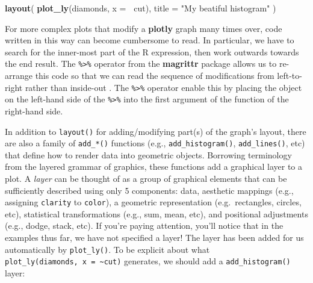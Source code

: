 \documentclass[
  12pt,
]{krantz}
\newenvironment{Shaded}{\begin{snugshade}}{\end{snugshade}}
\newcommand{\DataTypeTok}[1]{\textcolor[rgb]{0.13,0.29,0.53}{#1}}
\newcommand{\KeywordTok}[1]{\textcolor[rgb]{0.13,0.29,0.53}{\textbf{#1}}}
\newcommand{\NormalTok}[1]{#1}
\newcommand{\OperatorTok}[1]{\textcolor[rgb]{0.81,0.36,0.00}{\textbf{#1}}}
\newcommand{\StringTok}[1]{\textcolor[rgb]{0.31,0.60,0.02}{#1}}
\begin{document}
\begin{Shaded}
\begin{Highlighting}[]
\KeywordTok{layout}\NormalTok{(}
  \KeywordTok{plot_ly}\NormalTok{(diamonds, }\DataTypeTok{x =} \OperatorTok{~}\NormalTok{cut),}
  \DataTypeTok{title =} \StringTok{"My beatiful histogram"}
\NormalTok{)}
\end{Highlighting}
\end{Shaded}

For more complex plots that modify a \textbf{plotly} graph many times over, code written in this way can become cumbersome to read. In particular, we have to search for the inner-most part of the R expression, then work outwards towards the end result. The \texttt{\%\textgreater{}\%} operator from the \textbf{magrittr} package allows us to re-arrange this code so that we can read the sequence of modifications from left-to-right rather than inside-out \citep{magrittr}. The \texttt{\%\textgreater{}\%} operator enable this by placing the object on the left-hand side of the \texttt{\%\textgreater{}\%} into the first argument of the function of the right-hand side.

\begin{Shaded}
\end{Shaded}

In addition to \texttt{layout()} for adding/modifying part(s) of the graph's layout, there are also a family of \texttt{add\_*()} functions (e.g., \texttt{add\_histogram()}, \texttt{add\_lines()}, etc) that define how to render data into geometric objects. Borrowing terminology from the layered grammar of graphics, these functions add a graphical layer to a plot. A \emph{layer} can be thought of as a group of graphical elements that can be sufficiently described using only 5 components: data, aesthetic mappings (e.g., assigning \texttt{clarity} to \texttt{color}), a geometric representation (e.g.~rectangles, circles, etc), statistical transformations (e.g., sum, mean, etc), and positional adjustments (e.g., dodge, stack, etc). If you're paying attention, you'll notice that in the examples thus far, we have not specified a layer! The layer has been added for us automatically by \texttt{plot\_ly()}. To be explicit about what \texttt{plot\_ly(diamonds,\ x\ =\ \textasciitilde{}cut)} generates, we should add a \texttt{add\_histogram()} layer:
\end{document}
